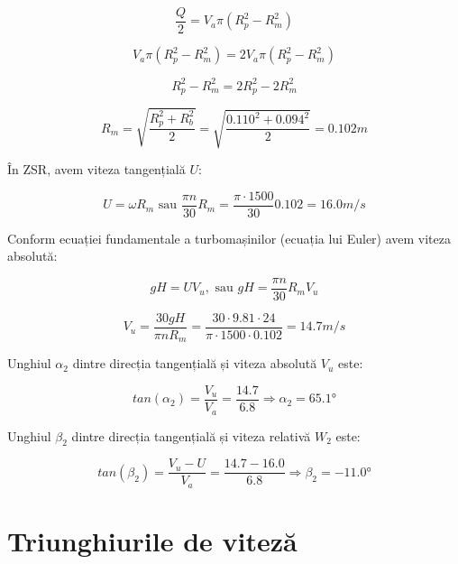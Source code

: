 \begin{equation}
\frac{Q}{2} = V_a \pi (R_p^2 - R_m^2) 
\end{equation}

\begin{equation}
V_a \pi (R_p^2 - R_m^2) = 2 V_a \pi (R_p^2 - R_m^2) 
\end{equation}

\begin{equation}
R_p^2 - R_m^2 = 2 R_p^2 - 2 R_m^2
\end{equation}

\begin{equation}
R_m = \sqrt{\frac{R_p^2 + R_b^2}{2}} = \sqrt{\frac{0.110^2 + 0.094^2}{2}} = 0.102\si{m}
\end{equation}

În ZSR, avem viteza tangențială $U$:

\begin{equation}
U = \omega R_m \text{ sau } \frac{\pi n}{30} R_m = \frac{\pi \cdot 1500}{30} 0.102 = 16.0 \si{m/s}
\end{equation}

Conform ecuației fundamentale a turbomașinilor (ecuația lui Euler) avem viteza absolută:

\begin{equation}
gH=UV_{u}, \text{ sau } gH=\frac{\pi n}{30} R_m V_{u}
\end{equation}

\begin{equation}
V_{u} = \frac{30gH}{\pi n R_m} = \frac{30 \cdot 9.81 \cdot 24 }{\pi \cdot 1500 \cdot 0.102} = 14.7 \si{m/s}
\end{equation}


Unghiul $\alpha_2$ dintre direcția tangențială și viteza absolută $V_u$ este:

\begin{equation}
tan(\alpha_{2 })=\frac{V_{u}}{V_{a}} = \frac{14.7}{6.8} \Rightarrow \alpha_{2}=65.1\si{\degree}
\end{equation}


Unghiul $\beta_2$ dintre direcția tangențială și viteza relativă $W_2$ este:

\begin{equation}
tan(\beta_{2})=\frac{V_u - U}{V_a} = \frac{14.7 - 16.0}{6.8} \Rightarrow \beta_{2} = -11.0\si{\degree}
\end{equation}


\section{Triunghiurile de viteză}

